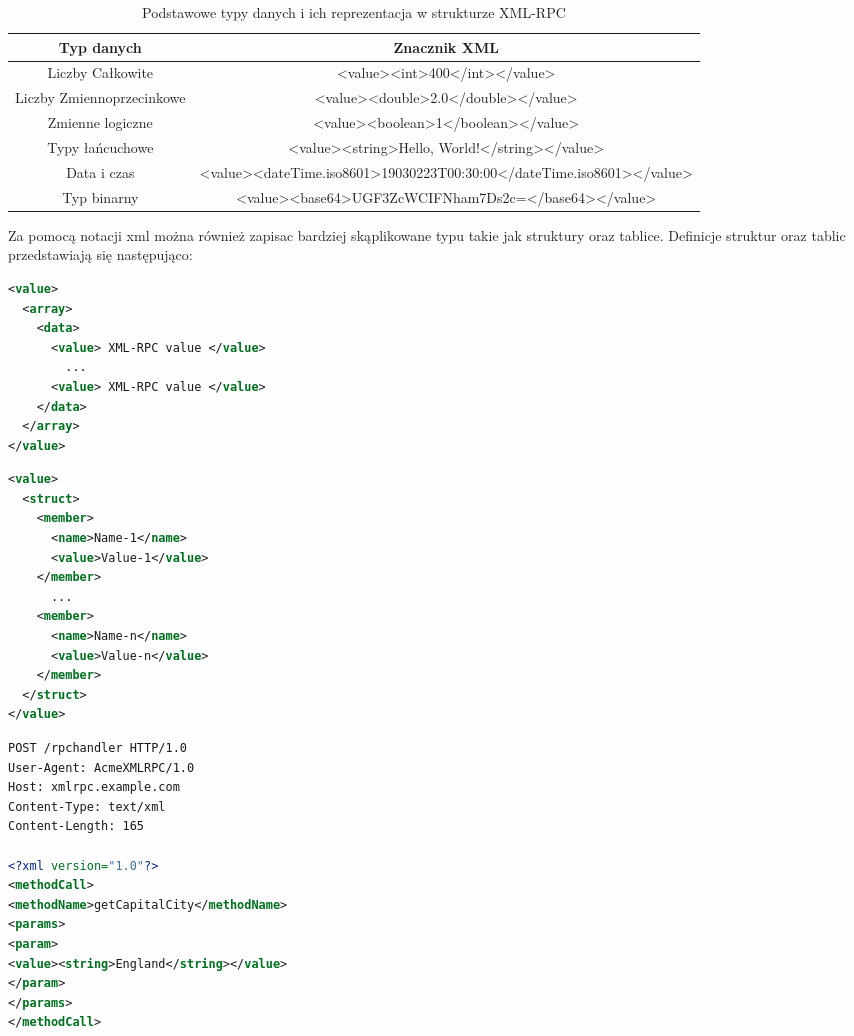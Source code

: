 \begin{table}[h]
    \caption{Podstawowe typy danych i ich reprezentacja w strukturze XML-RPC}
	\footnotesize
	\begin{center}
		\begin{tabular}{ |c|c| }
			\hline
			Typ danych                & Znacznik XML                                                          \\
			\hline\hline
			Liczby Całkowite          & <value><int>400</int></value>                                         \\
			\hline
			Liczby Zmiennoprzecinkowe & <value><double>2.0</double></value>                                   \\
			\hline
			Zmienne logiczne          & <value><boolean>1</boolean></value>                                   \\
			\hline
			Typy łańcuchowe           & <value><string>Hello, World!</string></value>                         \\
			\hline
			Data i czas               & <value><dateTime.iso8601>19030223T00:30:00</dateTime.iso8601></value> \\
            \hline
            Typ binarny & <value><base64>UGF3ZcWCIFNham7Ds2c=</base64></value> \\
            \hline
		\end{tabular}
	\end{center}
\end{table}
Za pomocą notacji xml można również zapisac bardziej skąplikowane typu takie jak struktury oraz tablice. Definicje struktur oraz tablic przedstawiają się następująco:
\begin{lstlisting}[language=XML, caption=Reprezentacja tablicy w XML-RPC]
<value> 
  <array> 
    <data> 
      <value> XML-RPC value </value> 
        ...
      <value> XML-RPC value </value> 
    </data> 
  </array> 
</value> 
\end{lstlisting}
\begin{lstlisting}[language=XML, caption=Reprezentacja struktury w XML-RPC]
<value> 
  <struct> 
    <member> 
      <name>Name-1</name> 
      <value>Value-1</value> 
    </member> 
      ... 
    <member> 
      <name>Name-n</name> 
      <value>Value-n</value> 
    </member> 
  </struct> 
</value> 
    \end{lstlisting}
\begin{lstlisting}[language=XML, caption=Przykład żądania POST]
POST /rpchandler HTTP/1.0  
User-Agent: AcmeXMLRPC/1.0  
Host: xmlrpc.example.com  
Content-Type: text/xml  
Content-Length: 165  

<?xml version="1.0"?>  
<methodCall> 
<methodName>getCapitalCity</methodName> 
<params> 
<param> 
<value><string>England</string></value> 
</param> 
</params> 
</methodCall>  
\end{lstlisting}
